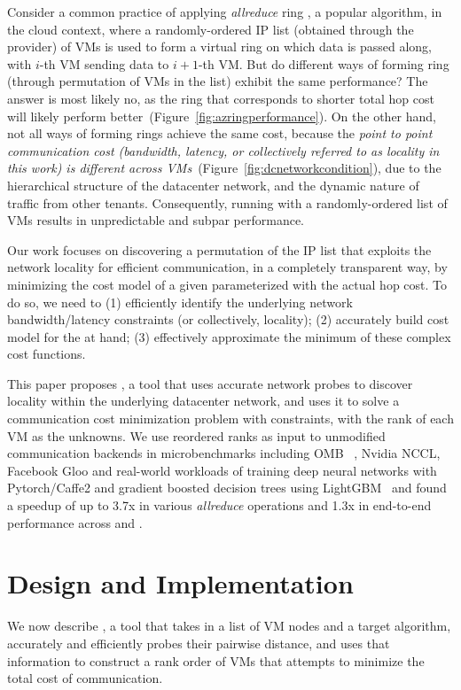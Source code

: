 Consider a common practice of applying \textit{allreduce} ring \mpi, a popular algorithm, in the cloud context, where a randomly-ordered IP list (obtained through the provider) of VMs is used to form a virtual ring on which data is passed along, with $i$-th VM sending data to $i+1$-th VM. But do different ways of forming ring (through permutation of VMs in the list) exhibit the same performance? The answer is most likely no, as the ring that corresponds to shorter total hop cost will likely perform better~(Figure~\ref{fig:azringperformance}). On the other hand, not all ways of forming rings achieve the same cost, because the \textit{point to point communication cost (bandwidth, latency, or collectively referred to as locality in this work) is different across VMs}~(Figure~\ref{fig:dcnetworkcondition}), due to the hierarchical structure of the datacenter network, and the dynamic nature of traffic from other tenants. Consequently, running \mpi with a randomly-ordered list of VMs results in unpredictable and subpar performance. 

Our work focuses on discovering a permutation of the IP list that exploits the network locality for efficient communication, in a completely transparent way, by minimizing the cost model of a given \mpi parameterized with the actual hop cost. To do so, we need to (1) efficiently identify the underlying network bandwidth/latency constraints (or collectively, locality); (2) accurately build cost model for the \mpi at hand; (3) effectively approximate the minimum of these complex cost functions.

This paper proposes \cmpi, a tool that uses accurate network probes to discover locality within the underlying datacenter network, and uses it to solve a communication cost minimization problem with constraints, with the rank of each VM as the unknowns. We use reordered ranks as input to unmodified communication backends in  microbenchmarks including OMB ~\cite{10.1007/978-3-642-33518-1_16}, Nvidia NCCL, Facebook Gloo and
real-world workloads of training deep neural networks with Pytorch/Caffe2 and gradient boosted decision trees using LightGBM~\cite{NIPS2016_6381,Ke2017LightGBMAH} and found a speedup of up to 3.7x in various \textit{allreduce} operations and 1.3x in end-to-end performance across \ectwo and \azure.

\section{Design and Implementation}
\label{sec:designandimpl}
We now describe \cmpi, a tool that takes in a list of VM nodes and a target algorithm, accurately and efficiently probes their pairwise distance, and uses that information to construct a rank order of VMs that attempts to minimize the total cost of communication.

